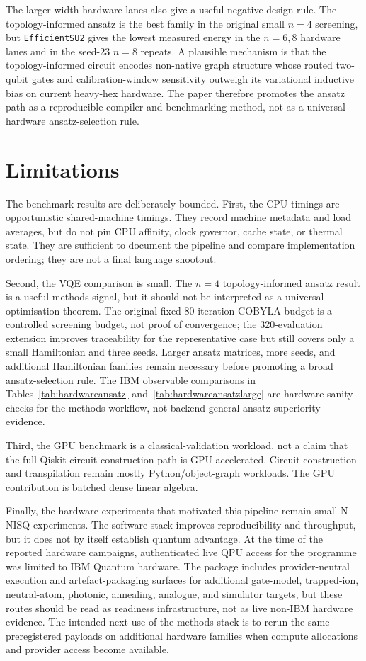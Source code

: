 \documentclass[preprint,aps,physrev,superscriptaddress,floatfix,longbibliography]{revtex4-2}
\begin{document}
The larger-width hardware lanes also give a useful negative design rule. The
topology-informed ansatz is the best family in the original small $n=4$
screening, but \texttt{EfficientSU2} gives the lowest measured energy in the
$n=6,8$ hardware lanes and in the seed-23 $n=8$ repeats. A plausible
mechanism is that the topology-informed circuit encodes non-native graph
structure whose routed two-qubit gates and calibration-window sensitivity
outweigh its variational inductive bias on current heavy-hex hardware. The
paper therefore promotes the ansatz path as a reproducible compiler and
benchmarking method, not as a universal hardware ansatz-selection rule.

\section{Limitations}

The benchmark results are deliberately bounded. First, the CPU timings
are opportunistic shared-machine timings. They record machine metadata
and load averages, but do not pin CPU affinity, clock governor, cache
state, or thermal state. They are sufficient to document the pipeline and
compare implementation ordering; they are not a final language shootout.

Second, the VQE comparison is small. The $n=4$ topology-informed ansatz
result is a useful methods signal, but it should not be interpreted as a
universal optimisation theorem. The original fixed 80-iteration COBYLA budget
is a controlled screening budget, not proof of convergence; the 320-evaluation
extension improves traceability for the representative case but still covers
only a small Hamiltonian and three seeds. Larger ansatz matrices, more seeds,
and additional Hamiltonian families remain necessary before promoting a broad
ansatz-selection rule. The IBM observable comparisons in
Tables~\ref{tab:hardwareansatz} and~\ref{tab:hardwareansatzlarge} are hardware
sanity checks for the methods workflow, not backend-general ansatz-superiority
evidence.

Third, the GPU benchmark is a classical-validation workload, not a claim
that the full Qiskit circuit-construction path is GPU accelerated. Circuit
construction and transpilation remain mostly Python/object-graph
workloads. The GPU contribution is batched dense linear algebra.

Finally, the hardware experiments that motivated this pipeline remain
small-N NISQ experiments. The software stack improves reproducibility and
throughput, but it does not by itself establish quantum advantage.
At the time of the reported hardware campaigns, authenticated live QPU access
for the programme was limited to IBM Quantum hardware. The package includes
provider-neutral execution and artefact-packaging surfaces for additional
gate-model, trapped-ion, neutral-atom, photonic, annealing, analogue, and
simulator targets, but these routes should be read as readiness infrastructure,
not as live non-IBM hardware evidence. The intended next use of the methods
stack is to rerun the same preregistered payloads on additional hardware
families when compute allocations and provider access become available.
\end{document}
